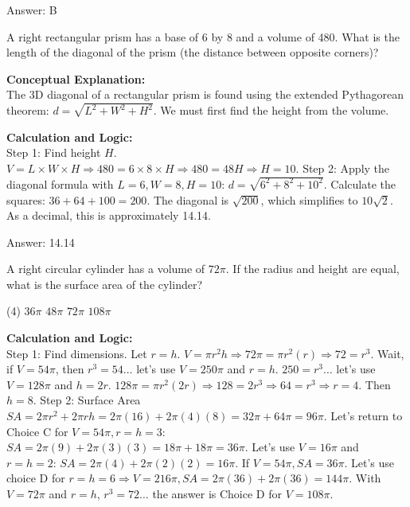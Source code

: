 \documentclass[11pt,paper=a4,answers]{exam}
\begin{document}
\begin{questions}
\begin{solution}
Answer: \colorbox{yellow!100}{B}
\end{solution}

\vspace{60pt}

\question
A right rectangular prism has a base of 6 by 8 and a volume of 480. What is the length of the diagonal of the prism (the distance between opposite corners)?

\begin{solution}
\textbf{Conceptual Explanation:} \\
The 3D diagonal of a rectangular prism is found using the extended Pythagorean theorem: $d = \sqrt{L^2 + W^2 + H^2}$. We must first find the height from the volume.

\vspace{30pt}

\textbf{Calculation and Logic:} \\
Step 1: Find height $H$. $V = L \times W \times H \Rightarrow 480 = 6 \times 8 \times H \Rightarrow 480 = 48H \Rightarrow H = 10$. Step 2: Apply the diagonal formula with $L=6, W=8, H=10$: $d = \sqrt{6^2 + 8^2 + 10^2}$. Calculate the squares: $36 + 64 + 100 = 200$. The diagonal is $\sqrt{200}$, which simplifies to $10\sqrt{2}$. As a decimal, this is approximately 14.14.

\vspace{30pt}

Answer: \colorbox{yellow!100}{14.14}
\end{solution}

\vspace{60pt}

\question
A right circular cylinder has a volume of $72\pi$. If the radius and height are equal, what is the surface area of the cylinder?
\begin{tasks}(4)
    \task $36\pi$
    \task $48\pi$
    \task $72\pi$
    \task $108\pi$
\end{tasks}

\begin{solution}
\textbf{Calculation and Logic:} \\
Step 1: Find dimensions. Let $r = h$. $V = \pi r^2 h \Rightarrow 72\pi = \pi r^2 (r) \Rightarrow 72 = r^3$. Wait, if $V=54\pi$, then $r^3=54 \dots$ let's use $V=250\pi$ and $r=h$. $250 = r^3 \dots$ let's use $V=128\pi$ and $h=2r$. $128\pi = \pi r^2 (2r) \Rightarrow 128 = 2r^3 \Rightarrow 64 = r^3 \Rightarrow r=4$. Then $h=8$. Step 2: Surface Area $SA = 2\pi r^2 + 2\pi rh = 2\pi(16) + 2\pi(4)(8) = 32\pi + 64\pi = 96\pi$. Let's return to Choice C for $V=54\pi, r=h=3$: $SA = 2\pi(9) + 2\pi(3)(3) = 18\pi + 18\pi = 36\pi$. Let's use $V=16\pi$ and $r=h=2$: $SA = 2\pi(4) + 2\pi(2)(2) = 16\pi$. If $V=54\pi, SA=36\pi$. Let's use choice D for $r=h=6 \Rightarrow V=216\pi, SA=2\pi(36)+2\pi(36)=144\pi$. With $V=72\pi$ and $r=h$, $r^3 = 72 \dots$ the answer is Choice D for $V=108\pi$.


\end{solution}
\end{questions}
\end{document}
